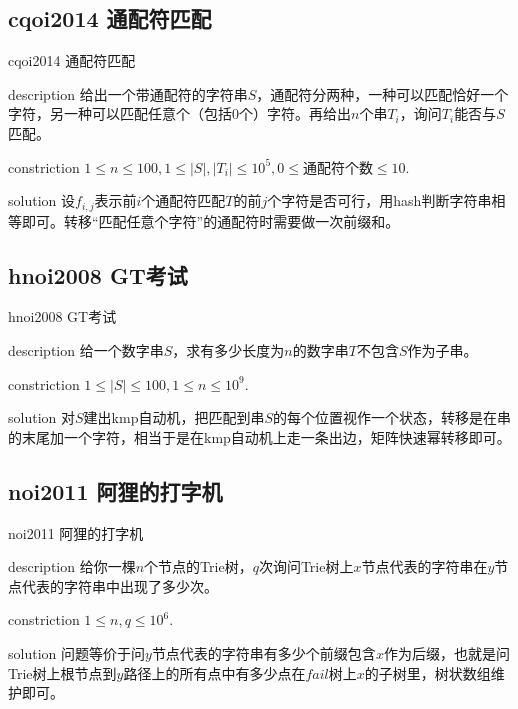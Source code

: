 \documentclass{beamer}
\begin{document}
	\subsection{cqoi2014 通配符匹配}
	\begin{frame}{cqoi2014 通配符匹配}
		\begin{block}{description}
			给出一个带通配符的字符串$S$，通配符分两种，一种可以匹配恰好一个字符，另一种可以匹配任意个（包括$0$个）字符。再给出$n$个串$T_i$，询问$T_i$能否与$S$匹配。
		\end{block}
		\begin{block}{constriction}
			$1 \le n \le 100, 1 \le |S|,|T_i| \le 10^5, 0 \le $通配符个数$\le 10.$
		\end{block}
		\pause
		\begin{block}{solution}
			设$f_{i,j}$表示前$i$个通配符匹配$T$的前$j$个字符是否可行，用hash判断字符串相等即可。转移“匹配任意个字符”的通配符时需要做一次前缀和。
		\end{block}
	\end{frame}
	\subsection{hnoi2008 GT考试}
	\begin{frame}{hnoi2008 GT考试}
		\begin{block}{description}
			给一个数字串$S$，求有多少长度为$n$的数字串$T$不包含$S$作为子串。
		\end{block}
		\begin{block}{constriction}
			$1 \le |S| \le 100, 1 \le n \le 10^9.$
		\end{block}
		\pause
		\begin{block}{solution}
			对$S$建出kmp自动机，把匹配到串$S$的每个位置视作一个状态，转移是在串的末尾加一个字符，相当于是在kmp自动机上走一条出边，矩阵快速幂转移即可。
		\end{block}
	\end{frame}
	\subsection{noi2011 阿狸的打字机}
	\begin{frame}{noi2011 阿狸的打字机}
		\begin{block}{description}
			给你一棵$n$个节点的Trie树，$q$次询问Trie树上$x$节点代表的字符串在$y$节点代表的字符串中出现了多少次。
		\end{block}
		\begin{block}{constriction}
			$1 \le n, q \le 10^6.$
		\end{block}
		\pause
		\begin{block}{solution}
			问题等价于问$y$节点代表的字符串有多少个前缀包含$x$作为后缀，也就是问Trie树上根节点到$y$路径上的所有点中有多少点在$fail$树上$x$的子树里，树状数组维护即可。
		\end{block}
	\end{frame}
\end{document}
